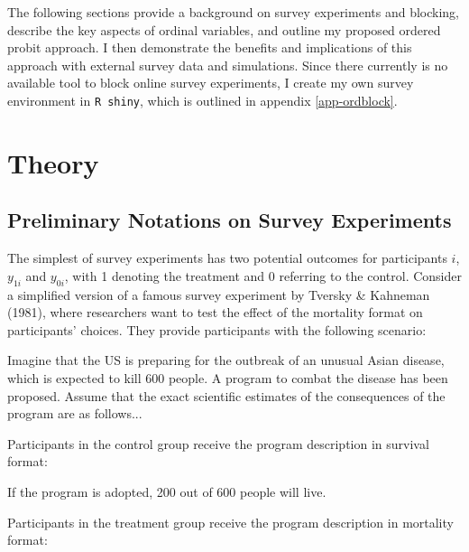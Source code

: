 \documentclass[12pt,econ]{sources/authesis}
\begin{document}
The following sections provide a background on survey experiments and blocking, describe the key aspects of ordinal variables, and outline my proposed ordered probit approach. I then demonstrate the benefits and implications of this approach with external survey data and simulations. Since there currently is no available tool to block online survey experiments, I create my own survey environment in \texttt{R\ shiny}, which is outlined in appendix \ref{app-ordblock}.

\hypertarget{ordblock-theory}{%
\section{Theory}\label{ordblock-theory}}

\hypertarget{ordblock-theory-experiments}{%
\subsection{Preliminary Notations on Survey Experiments}\label{ordblock-theory-experiments}}

The simplest of survey experiments has two potential outcomes for participants \(i\), \(y_{1i}\) and \(y_{0i}\), with 1 denoting the treatment and 0 referring to the control. Consider a simplified version of a famous survey experiment by Tversky \& Kahneman (1981), where researchers want to test the effect of the mortality format on participants' choices. They provide participants with the following scenario:

\vspace{0.3cm}
\begin{adjustwidth}{50pt}{50pt}
\ssp
\noindent Imagine that the US is preparing for the outbreak of an unusual Asian disease, which is expected to kill 600 people. A program to combat the disease has been proposed. Assume that the exact scientific estimates of the consequences of the program are as follows...
\end{adjustwidth}
Participants in the control group receive the program description in survival format:

\vspace{0.3cm}
\begin{adjustwidth}{50pt}{50pt}
\ssp
\noindent If the program is adopted, 200 out of 600 people will live.
\end{adjustwidth}
Participants in the treatment group receive the program description in mortality format:
\end{document}
